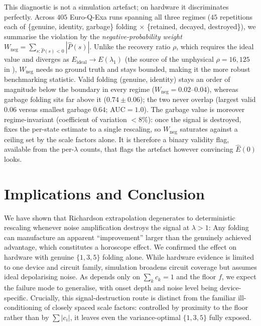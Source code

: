 \documentclass[10pt,conference, letterpaper]{IEEEtran}
\begin{document}
This diagnostic is not a simulation artefact; on hardware it discriminates perfectly. Across $405$ Euro-Q-Exa runs spanning all three regimes ($45$ repetitions each of \{genuine, identity, garbage\} folding $\times$ \{retained, decayed, destroyed\}), we summarise the violation by the \emph{negative-probability weight} $W_\text{neg}=\sum_{s:\hat{P}(s)<0}|\hat{P}(s)|$. Unlike the recovery ratio $\rho$, which requires the ideal value and diverges as $E_\text{ideal}\!\to\!E(\lambda_1)$ (the source of the unphysical $\rho=16,125$ in ), $W_\text{neg}$ needs no ground truth and stays bounded, making it the more robust benchmarking statistic. Valid folding (genuine, identity) stays an order of magnitude below the boundary in every regime ($W_\text{neg}=0.02$--$0.04$), whereas garbage folding sits far above it ($0.74\pm0.06$); the two never overlap (largest valid $0.06$ versus smallest garbage $0.64$; AUC$=1.0$). The garbage value is moreover regime-invariant (coefficient of variation ${<}8\%$): once the signal is destroyed,  fixes the per-state estimate to a single rescaling, so $W_\text{neg}$ saturates against a ceiling set by the scale factors alone. It is therefore a binary validity flag, available from the per-$\lambda$ counts, that flags the artefact however convincing $\hat{E}(0)$ looks.

\section{Implications and Conclusion}
\label{sec:conclusion}
We have shown that Richardson extrapolation degenerates to deterministic rescaling whenever noise amplification destroys the signal at $\lambda>1$: Any folding can manufacture an apparent \enquote{improvement} larger than the genuinely achieved advantage, which constitutes a horoscope effect. We confirmed the effect on hardware with genuine $\{1,3,5\}$ folding alone. While hardware evidence is limited to one device and circuit family, simulation broadens circuit coverage but assumes ideal depolarising noise. As  depends only on $\sum_k c_k=1$ and the floor $f$, we expect the failure mode to generalise, with onset depth and noise level being device-specific. Crucially, this signal-destruction route is distinct from the familiar ill-conditioning of closely spaced scale factors: controlled by proximity to the floor rather than by $\sum|c_i|$, it leaves even the variance-optimal $\{1,3,5\}$ fully exposed.
\end{document}
